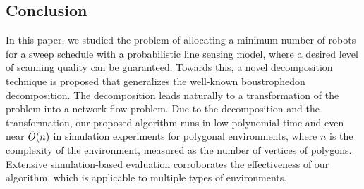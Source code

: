 \subsection{Conclusion }%

In this paper, we studied the problem of allocating a minimum number of robots for a sweep schedule with a probabilistic line sensing model, where a desired level of scanning quality can be guaranteed. 
Towards this, a novel decomposition technique is proposed that generalizes the well-known boustrophedon decomposition. The decomposition leads naturally to  a transformation of the problem into a network-flow problem. Due to the decomposition and the transformation, our proposed algorithm runs in low polynomial time and even near $\Tilde{O}(n)$ in simulation experiments for polygonal environments, where $n$ is the complexity of the environment, measured as the number of vertices of polygons. Extensive simulation-based evaluation corroborates the effectiveness of our algorithm, which is applicable to multiple types of environments.  


